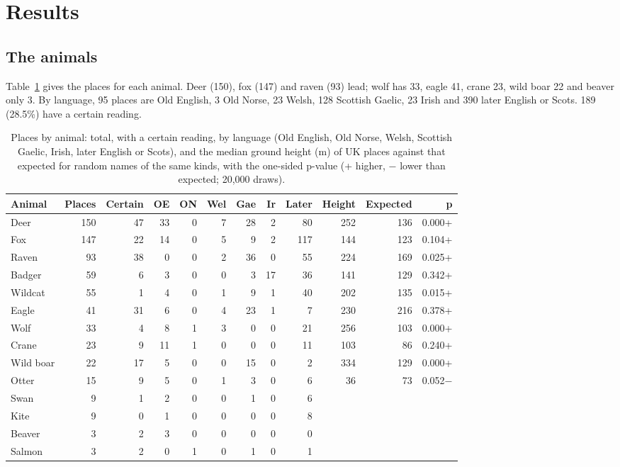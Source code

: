 \documentclass[11pt,a4paper]{article}
\begin{document}
\section{Results}
\subsection{The animals}
Table~\ref{tab:animals} gives the places for each animal. Deer (150), fox (147) and raven (93) lead; wolf has 33, eagle 41, crane 23, wild boar 22 and beaver only 3. By language, 95 places are Old English, 3 Old Norse, 23 Welsh, 128 Scottish Gaelic, 23 Irish and 390 later English or Scots. 189 (28.5\%) have a certain reading.

\begin{table}[tbp]\centering\footnotesize\setlength{\tabcolsep}{4pt}\caption{Places by animal: total, with a certain reading, by language (Old English, Old Norse, Welsh, Scottish Gaelic, Irish, later English or Scots), and the median ground height (m) of UK places against that expected for random names of the same kinds, with the one-sided p-value (+ higher, $-$ lower than expected; 20,000 draws).}\label{tab:animals}\begin{tabular}{lrrrrrrrrrrr}\toprule Animal & Places & Certain & OE & ON & Wel & Gae & Ir & Later & Height & Expected & p\\\midrule
Deer & 150 & 47 & 33 & 0 & 7 & 28 & 2 & 80 & 252 & 136 & 0.000+\\
Fox & 147 & 22 & 14 & 0 & 5 & 9 & 2 & 117 & 144 & 123 & 0.104+\\
Raven & 93 & 38 & 0 & 0 & 2 & 36 & 0 & 55 & 224 & 169 & 0.025+\\
Badger & 59 & 6 & 3 & 0 & 0 & 3 & 17 & 36 & 141 & 129 & 0.342+\\
Wildcat & 55 & 1 & 4 & 0 & 1 & 9 & 1 & 40 & 202 & 135 & 0.015+\\
Eagle & 41 & 31 & 6 & 0 & 4 & 23 & 1 & 7 & 230 & 216 & 0.378+\\
Wolf & 33 & 4 & 8 & 1 & 3 & 0 & 0 & 21 & 256 & 103 & 0.000+\\
Crane & 23 & 9 & 11 & 1 & 0 & 0 & 0 & 11 & 103 & 86 & 0.240+\\
Wild boar & 22 & 17 & 5 & 0 & 0 & 15 & 0 & 2 & 334 & 129 & 0.000+\\
Otter & 15 & 9 & 5 & 0 & 1 & 3 & 0 & 6 & 36 & 73 & 0.052$-$\\
Swan & 9 & 1 & 2 & 0 & 0 & 1 & 0 & 6 & & &\\
Kite & 9 & 0 & 1 & 0 & 0 & 0 & 0 & 8 & & &\\
Beaver & 3 & 2 & 3 & 0 & 0 & 0 & 0 & 0 & & &\\
Salmon & 3 & 2 & 0 & 1 & 0 & 1 & 0 & 1 & & &\\
\bottomrule\end{tabular}\end{table}
\end{document}
